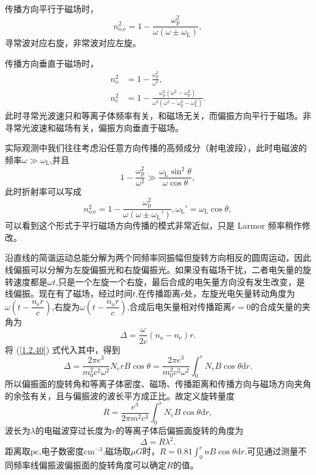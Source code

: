 \documentclass[../天体物理基础.tex]{subfiles}
\begin{document}
传播方向平行于磁场时，
\begin{equation}
n_{\text{o,e}}^{2}=1-\frac{\omega_{\text{p}}^{2}}{\omega\left(\omega\pm\omega_{\text{L}}\right)},
\end{equation}
寻常波对应右旋，非常波对应左旋。

传播方向垂直于磁场时，
\begin{align}
n_{\text{o}}^{2}&=1-\frac{\omega^{2}_{\text{p}}}{\omega^{2}},\\
n_{\text{e}}^{2}&=1-\frac{\omega_{\text{p}}^{2}\left(\omega^{2}-\omega_{\text{p}}^{2}\right)}{\omega^{2}\left(\omega^{2}-\omega_{\text{p}}^{2}-\omega_{\text{L}}^{2}\right)}.
\end{align}
此时寻常光波速只和等离子体频率有关，和磁场无关，而偏振方向平行于磁场。非寻常光波速和磁场有关，偏振方向垂直于磁场。

实际观测中我们往往考虑沿任意方向传播的高频成分（射电波段），此时电磁波的频率$\omega\gg\omega_{\text{L}}$,并且
\begin{equation}
1-\frac{\omega_{\text{p}}^{2}}{\omega^{2}}\gg\frac{\omega_{\text{L}}\sin^{2}\theta}{\omega\cos\theta},
\end{equation}
此时折射率可以写成
\begin{equation}
n^{2}_{\text{o,e}}=1-\frac{\omega_{\text{p}}^{2}}{\omega\left(\omega\pm\omega_{\text{L}}'\right)},\omega_{\text{L}}'=\omega_{\text{L}}\cos\theta,\label{1.2.40}
\end{equation}
可以看到这个形式于平行磁场方向传播的模式非常近似，只是 Larmor 频率稍作修改。

沿直线的简谐运动总能分解为两个同频率同振幅但旋转方向相反的圆周运动，因此线偏振可以分解为左旋偏振光和右旋偏振光。如果没有磁场干扰，二者电矢量的旋转速度都是$\omega t$,只是一个左旋一个右旋，最后合成的电矢量方向没有发生改变，是线偏振。现在有了磁场，经过时间$t$,在传播距离$r$处，左旋光电矢量转动角度为$\omega\left(t-\dfrac{n_{\text{e}}r}{c}\right)$,右旋为$\omega\left(t-\dfrac{n_{\text{o}}r}{c}\right)$,合成后电矢量相对传播距离$r=0$的合成矢量的夹角为
\begin{equation}
\Delta{}=\frac{\omega}{2c}\left(n_{\text{o}}-n_{\text{e}}\right)r.
\end{equation}
将 (\ref{1.2.40}) 式代入其中，得到
\begin{equation}
\Delta{}=\frac{2\pi e^{3}}{m_{0}^{2}c^{2}\omega^{2}}N_{e}rB\cos\theta=\frac{2\pi e^{3}}{m_{0}^{2}c^{2}\omega^{2}}\int_{0}^{r}N_{e}B\cos\theta\mathrm{d}r.
\end{equation}
所以偏振面的旋转角和等离子体密度、磁场、传播距离和传播方向与磁场方向夹角的余弦有关，且与偏振波的波长平方成正比。故定义旋转量度
\begin{equation}
R=\frac{e^{3}}{2\pi m^{2}c^{4}}\int_{0}^{r}N_{e}B\cos\theta\mathrm{d}r,
\end{equation}
波长为$\lambda$的电磁波穿过长度为$r$的等离子体后偏振面旋转的角度为
\begin{equation}
\Delta{}=R\lambda^{2}.
\end{equation}
距离取$\mathrm{pc}$,电子数密度$\mathrm{cm^{-3}}$,磁场取$\mu G$时，$R=0.81\int_{0}^{r}nB\cos\theta\mathrm{d}r$.可见通过测量不同频率线偏振波偏振面的旋转角度可以确定$R$的值。
\end{document}
